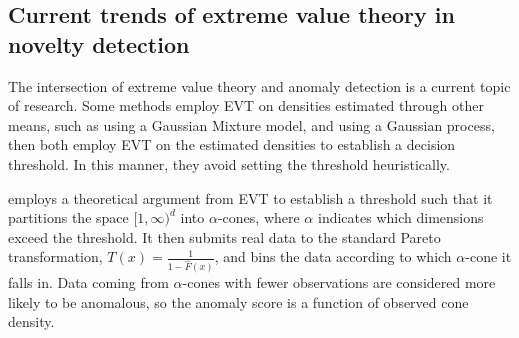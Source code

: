 \subsection{Current trends of extreme value theory in novelty detection}
The intersection of extreme value theory and anomaly detection is a current topic
    of research.  Some methods employ EVT on densities estimated through other
    means, such as \cite{clifton2011} using a Gaussian Mixture model, and \cite{gu2021}
    using a Gaussian process, then both employ EVT on the estimated densities to
    establish a decision threshold.  In this manner, they avoid setting the threshold heuristically.

\cite{goix2017} employs a theoretical argument from EVT to establish a threshold
    such that it partitions the space $[1,\infty)^d$ into $\alpha$-cones, where 
    $\alpha$ indicates which dimensions exceed the threshold.  It then submits 
    real data to the standard Pareto transformation,
    $T(x) = \frac{1}{1 - \hat{F}(x)}$, and bins the data according to which 
    $\alpha$-cone it falls in.  Data coming from $\alpha$-cones with fewer 
    observations are considered more likely to be anomalous, so the anomaly score
    is a function of observed cone density.
 
